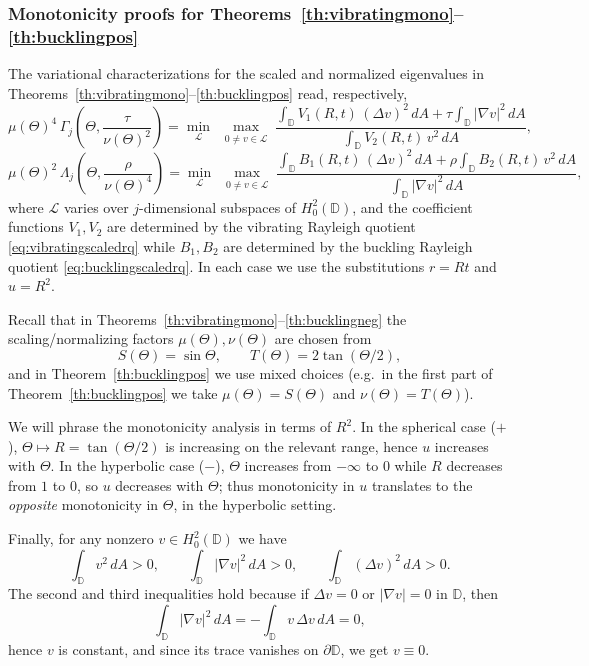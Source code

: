 \documentclass[11pt]{amsart}
\theoremstyle{definition}
\numberwithin{equation}{section}
\newcommand{\grad}{\nabla}
\newcommand{\D}{\mathbb{D}}
\begin{document}
\subsubsection*{Monotonicity proofs for Theorems~\ref{th:vibratingmono}--\ref{th:bucklingpos}}

The variational characterizations for the scaled and normalized eigenvalues in Theorems~\ref{th:vibratingmono}--\ref{th:bucklingpos} read, respectively,
\begin{equation}\label{eq:rq_square}
\mu(\Theta)^4\,\Gamma_j\!\left(\Theta,\frac{\tau}{\nu(\Theta)^2}\right)
= \min_{\mathcal L}\ \max_{\substack{0\neq v\in\mathcal L}}
\frac{\displaystyle \int_{\D} V_1(R,t)\,(\Delta v)^2\,dA + \tau \int_{\D}|\nabla v|^2\,dA}
{\displaystyle \int_{\D} V_2(R,t)\,v^2\,dA},
\end{equation}
\begin{equation}\label{eq:rq_squaresquare}
\mu(\Theta)^2\,\Lambda_j\!\left(\Theta,\frac{\rho}{\nu(\Theta)^4}\right)
= \min_{\mathcal L}\ \max_{\substack{0\neq v\in\mathcal L}}
\frac{\displaystyle \int_{\D} B_1(R,t)\,(\Delta v)^2\,dA + \rho \int_{\D} B_2(R,t)\,v^2\,dA}
{\displaystyle \int_{\D}|\nabla v|^2\,dA},
\end{equation}
where $\mathcal L$ varies over $j$-dimensional subspaces of $H_0^2(\D)$, and the coefficient functions $V_1,V_2$ are determined by the vibrating Rayleigh quotient \eqref{eq:vibratingscaledrq} while $B_1,B_2$ are determined by the buckling Rayleigh quotient \eqref{eq:bucklingscaledrq}. In each case we use the substitutions $r=Rt$ and $u=R^2$.

Recall that in Theorems~\ref{th:vibratingmono}--\ref{th:bucklingneg} the scaling/normalizing factors $\mu(\Theta),\nu(\Theta)$ are chosen from
\[
S(\Theta)=\sin\Theta,\qquad T(\Theta)=2\tan(\Theta/2),
\]
and in Theorem~\ref{th:bucklingpos} we use mixed choices (e.g.\ in the first part of Theorem~\ref{th:bucklingpos} we take $\mu(\Theta)=S(\Theta)$ and $\nu(\Theta)=T(\Theta)$). 

We will phrase the monotonicity analysis in terms of $R^2$. In the spherical case ($+$), $\Theta\mapsto R=\tan(\Theta/2)$ is increasing on the relevant range, hence $u$ increases with $\Theta$. In the hyperbolic case ($-$), $\Theta$ increases from $-\infty$ to $0$ while $R$ decreases from $1$ to $0$, so $u$ decreases with $\Theta$; thus monotonicity in $u$ translates to the \emph{opposite} monotonicity in $\Theta$, in the hyperbolic setting.

Finally, for any nonzero $v\in H_0^2(\D)$ we have
\[
\int_{\D} v^2\,dA>0,\qquad \int_{\D}|\nabla v|^2\,dA>0,\qquad \int_{\D}(\Delta v)^2\,dA>0.
\]
The second and third inequalities hold because if $\Delta v=0$ or $|\grad v| = 0$ in $\D$, then
\[
\int_{\D} |\nabla v|^2\,dA=-\int_{\D} v\,\Delta v\,dA=0,
\]
hence $v$ is constant, and since its trace vanishes on $\partial\D$, we get $v\equiv 0$.
\end{document}
